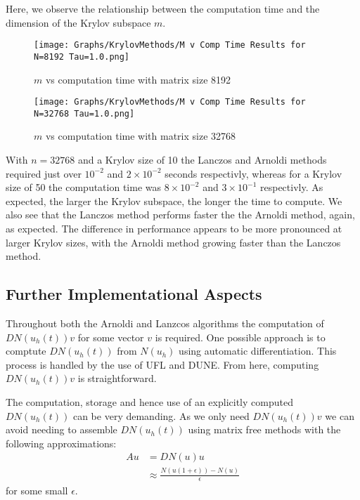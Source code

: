 Here, we observe the relationship between the computation time and the dimension of the Krylov subspace $m$.
\begin{figure}[H]
    \centering
    \begin{minipage}{0.49\textwidth}
        \texttt{[image: Graphs/KrylovMethods/M v Comp Time Results for N=8192 Tau=1.0.png]} %
        \caption{$m$ vs computation time with matrix size 8192}
        \label{fig:mCTKrylov1}
    \end{minipage}\hfill
    \centering
    \begin{minipage}{0.49\textwidth}
        \texttt{[image: Graphs/KrylovMethods/M v Comp Time Results for N=32768 Tau=1.0.png]} %
        \caption{$m$ vs computation time with matrix size 32768}
        \label{fig:mCTKrylov2}
    \end{minipage}\hfill
\end{figure}
With $n=32768$ and a Krylov size of 10 the Lanczos and Arnoldi methods required just over $10^{-2}$ and $2\times 10^{-2}$ seconds respectivly,
whereas for a Krylov size of 50 the computation time was $8\times 10^{-2}$ and $3\times 10^{-1}$ respectivly.
As expected, the larger the Krylov subspace, the longer the time to compute.
We also see that the Lanczos method performs faster the the Arnoldi method, again, as expected.
The difference in performance appears to be more pronounced at larger Krylov sizes, with the Arnoldi method growing faster than the Lanczos method.

\subsection{Further Implementational Aspects}
Throughout both the Arnoldi and Lanzcos algorithms the computation of $DN(u_h(t))v$ for some vector $v$ is required.
One possible approach is to comptute $DN(u_h(t))$ from $N(u_h)$ using automatic differentiation.
This process is handled by the use of UFL\cite{Alnaes2014} and DUNE\cite{Bastian2021}.
From here, computing $DN(u_h(t))v$ is straightforward.

The computation, storage and hence use of an explicitly computed $DN(u_h(t))$ can be very demanding.
As we only need $DN(u_h(t))v$ we can avoid needing to assemble $DN(u_h(t))$ using matrix free methods with the following approximations:
\begin{align*}
    Au &= DN(u)u\\
    &\approx \frac{N(u(1+\epsilon))-N(u)}{\epsilon}
\end{align*}
for some small $\epsilon$.
